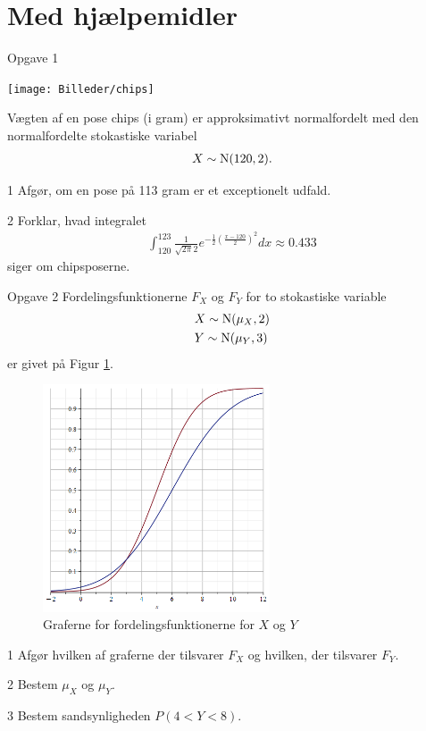 \section*{Med hjælpemidler}
\begin{opgavetekst}{Opgave 1}
	\begin{center}
		\texttt{[image: Billeder/chips]}
	\end{center}
	Vægten af en pose chips (i gram) er approksimativt normalfordelt med den normalfordelte 
	stokastiske variabel
	\begin{align*}
		X \sim \textnormal{N}(120,2).
	\end{align*}
\end{opgavetekst}
\begin{delopgave}{}{1}
	Afgør, om en pose på 113 gram er et exceptionelt udfald.
\end{delopgave}
\begin{delopgave}{}{2}
	Forklar, hvad integralet 
	\begin{align*}
		\int_{120}^{123}\frac{1}{\sqrt{2\pi}2}e^{-\frac{1}{2}\left(\frac{x-120}{2}\right)^2}dx
		\approx 0.433
	\end{align*}
	siger om chipsposerne.
\end{delopgave}


\begin{opgavetekst}{Opgave 2}
	Fordelingsfunktionerne $F_X$ og $F_Y$ for to stokastiske variable
	\begin{align*}
		&X \sim \textnormal{N}(\mu_X,2)\\
		&Y \sim \textnormal{N}(\mu_Y,3)
	\end{align*}
	er givet på Figur \ref{fig:fordeling}.
	\begin{figure}[H]
		\centering
		\includegraphics[width=0.6\textwidth]{Billeder/fordelinger}
		\caption{Graferne for fordelingsfunktionerne for $X$ og $Y$}
		\label{fig:fordeling}
	\end{figure}
	\phantom{h}
\end{opgavetekst}
\begin{delopgave}{}{1}
	Afgør hvilken af graferne der tilsvarer $F_X$ og hvilken, der tilsvarer $F_Y$.
\end{delopgave}
\begin{delopgave}{}{2}
	Bestem $\mu_X$ og $\mu_Y$.
\end{delopgave}
\begin{delopgave}{}{3}
	Bestem sandsynligheden $P(4<Y<8)$.
\end{delopgave}


